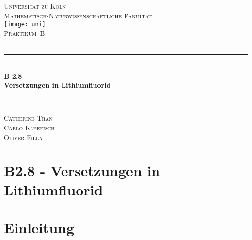 \documentclass[12pt,a4paper]{scrartcl}
\numberwithin{equation}{section} %
\newcommand{\HRule}{\rule{\linewidth}{0.7mm}}
\renewcommand{\[}{} %
\renewcommand{\]}{\noindent} %
\begin{document}
\begin{titlepage}
	\pagestyle{empty}

	\begin{center}

	\textsc{\LARGE Universität zu Köln }\\ [0.4cm]
	\textsc{Mathematisch-Naturwissenschaftliche Fakultät} \\[1.5cm]

	\texttt{[image: uni]}\\[1.5cm]  %

	\textsc{\Large Praktikum~B}\\[2mm]
	\textsc{}\\[10mm]
	\HRule \\[0.4cm]

		{	\Huge \bfseries B 2.8}\\[0.4cm]
			{	\huge \bfseries Versetzungen in Lithiumfluorid}\\[0.3cm]
	
	\HRule \\[3cm]

			\textsc{\Large Catherine Tran } \\[3pt]
		\textsc{\Large Carlo Kleefisch } \\[3pt]
		\textsc{\Large Oliver Filla } \\[3pt]
		
	\end{center}
\end{titlepage}

\newpage
\tableofcontents
\newpage

\hypertarget{b2.8---versetzungen-in-lithiumfluorid}{%
\section{B2.8 - Versetzungen in
Lithiumfluorid}\label{b2.8---versetzungen-in-lithiumfluorid}}

\hypertarget{einleitung}{%
\section{Einleitung}\label{einleitung}}
\end{document}
